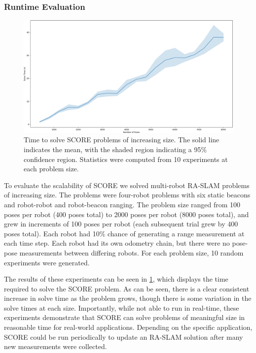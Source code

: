 \MultiRobotAPEBoxPlot


\subsubsection{Runtime Evaluation}
\label{sec:runtime-evaluation}

\begin{figure}[!tp]
    \begin{center}
        \includegraphics[width=\linewidth, trim={0mm 0mm 0mm 0mm},clip]{figures/score_runtimes_confidence-trimmy.png}
    \end{center}
    \vspace{-2mm}
    \caption{Time to solve SCORE problems of increasing size. The solid
    line indicates the mean, with the shaded region indicating a 95\%
    confidence region. Statistics were computed from 10 experiments at
    each problem size.}
    \label{fig:runtime-evaluation}
    \vspace{-4mm}
\end{figure}

To evaluate the scalability of SCORE we solved multi-robot RA-SLAM problems of
increasing size. The problems were four-robot problems with six static beacons
and robot-robot and robot-beacon ranging. The problem size ranged from 100 poses
per robot (400 poses total) to 2000 poses per robot (8000 poses total), and grew
in increments of 100 poses per robot (each subsequent trial grew by 400 poses
total). Each robot had 10\% chance of generating a range measurement at each
time step. Each robot had its own odometry chain, but there were no pose-pose
measurements between differing robots. For each problem size, 10 random
experiments were generated.

The results of these experiments can be seen in \cref{fig:runtime-evaluation},
which displays the time required to solve the SCORE problem. As can be seen,
there is a clear consistent increase in solve time as the problem grows, though
there is some variation in the solve times at each size. Importantly, while not
able to run in real-time, these experiments demonstrate that SCORE can solve
problems of meaningful size in reasonable time for real-world applications.
Depending on the specific application, SCORE could be run periodically to update
an RA-SLAM solution after many new measurements were collected.
